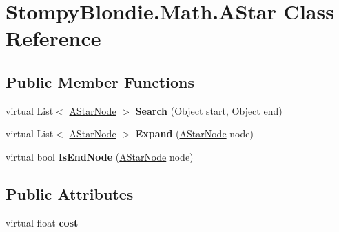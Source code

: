 \hypertarget{class_stompy_blondie_1_1_math_1_1_a_star}{}\section{Stompy\+Blondie.\+Math.\+A\+Star Class Reference}
\label{class_stompy_blondie_1_1_math_1_1_a_star}
\subsection*{Public Member Functions}
\begin{DoxyCompactItemize}
\item 
\mbox{\label{class_stompy_blondie_1_1_math_1_1_a_star_abba11aaec721f3d70f8998d64ccdb299}} 
virtual List$<$ \mbox{\hyperlink{class_stompy_blondie_1_1_math_1_1_a_star_node}{A\+Star\+Node}} $>$ {\bfseries Search} (Object start, Object end)
\item 
\mbox{\label{class_stompy_blondie_1_1_math_1_1_a_star_a1ab565fca68068ebbf331736a144ead9}} 
virtual List$<$ \mbox{\hyperlink{class_stompy_blondie_1_1_math_1_1_a_star_node}{A\+Star\+Node}} $>$ {\bfseries Expand} (\mbox{\hyperlink{class_stompy_blondie_1_1_math_1_1_a_star_node}{A\+Star\+Node}} node)
\item 
\mbox{\label{class_stompy_blondie_1_1_math_1_1_a_star_a310801f602808b6cf4d7cb468a825442}} 
virtual bool {\bfseries Is\+End\+Node} (\mbox{\hyperlink{class_stompy_blondie_1_1_math_1_1_a_star_node}{A\+Star\+Node}} node)
\end{DoxyCompactItemize}
\subsection*{Public Attributes}
\begin{DoxyCompactItemize}
\item 
\mbox{\label{class_stompy_blondie_1_1_math_1_1_a_star_a2e63d84e2680f0047a2beb68b4e19d6e}} 
virtual float {\bfseries cost}
\end{DoxyCompactItemize}
